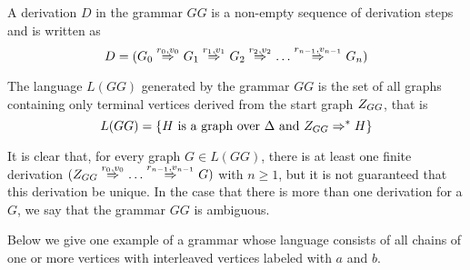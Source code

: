 \documentclass[]{report}
\begin{document}
\begin{definition}
	A derivation $D$ in the grammar $GG$ is a non-empty sequence of derivation steps and is written as
	\[ 
		D = (G_0 \deriv{r_0}{v_0}{} G_1 \deriv{r_1}{v_1}{} G_2 \deriv{r_2}{v_2}{} \dots \deriv{r_{n-1}}{v_{n-1}}{} G_n)
	\]
\end{definition}

\begin{definition}
	The language $L(GG)$ generated by the grammar $GG$ is the set of all graphs containing only terminal vertices derived from the start graph $Z_{GG}$, that is
	\[
		L(GG) = \{H \text{ is a graph over } \Delta \text{ and } Z_{GG} \Rightarrow^*_{} H\}
	\]
\end{definition}

It is clear that, for every graph $G \in L(GG)$, there is at least one finite derivation $(\startG{GG} \deriv{r_0}{v_0}{} \dots \deriv{r_{n-1}}{v_{n-1}}{} G)$ with $n \ge 1$, but it is not guaranteed that this derivation be unique. In the case that there is more than one derivation for a $G$, we say that the grammar $GG$ is ambiguous.

Below we give one example of a grammar whose language consists of all chains of one or more vertices with interleaved vertices labeled with $a$ and $b$.
\end{document}
